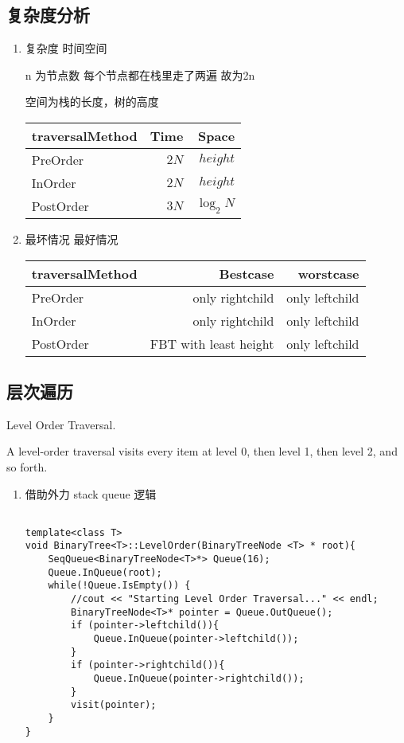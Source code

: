 \documentclass[UTF8]{ctexart}
\begin{document}
\subsection*{复杂度分析}
\begin{enumerate}
    \item   复杂度 时间空间
    
    n 为节点数 每个节点都在栈里走了两遍 故为2n

    空间为栈的长度，树的高度

    \begin{tabular}{|l|r|r|} \hline
        traversalMethod & Time & Space \\\hline
        PreOrder & $2N$ & $height$ \\
        InOrder & $2N$ & $height$ \\
        PostOrder & $3N$ & $\log _2 N$ \\\hline
    \end{tabular}
    

    \item   最坏情况 最好情况 %
    

    \begin{tabular}{|l|r|r|} \hline   
    traversalMethod & Bestcase & worstcase \\\hline
        PreOrder & only rightchild & only leftchild \\
        InOrder & only rightchild & only leftchild \\
        PostOrder & FBT with least height & only leftchild \\\hline
    \end{tabular}
\end{enumerate}

\subsection*{层次遍历}

Level Order Traversal. 

A level-order traversal visits every item at level 0, then level 1, then level 2, and so forth.

\begin{enumerate}
    \item   借助外力 stack queue 逻辑
    \begin{lstlisting}[style=cppstyle]
        
template<class T>
void BinaryTree<T>::LevelOrder(BinaryTreeNode <T> * root){
    SeqQueue<BinaryTreeNode<T>*> Queue(16);
    Queue.InQueue(root);
    while(!Queue.IsEmpty()) {
        //cout << "Starting Level Order Traversal..." << endl;
        BinaryTreeNode<T>* pointer = Queue.OutQueue();
        if (pointer->leftchild()){
            Queue.InQueue(pointer->leftchild());
        }
        if (pointer->rightchild()){
            Queue.InQueue(pointer->rightchild());
        }
        visit(pointer);
    }
}

    \end{lstlisting}
\end{enumerate}
\end{document}
